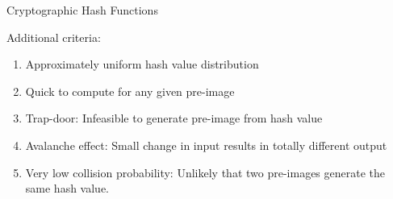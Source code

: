 \documentclass[handout]{beamer}
\begin{document}
\begin{frame}{Cryptographic Hash Functions}

Additional criteria:
	\begin{enumerate}
		\item Approximately uniform hash value distribution
		\item Quick to compute for any given pre-image
		\item Trap-door: Infeasible to generate pre-image from hash value
		\item Avalanche effect: Small change in input results in totally different output
		\item Very low collision probability: Unlikely that two pre-images generate the same hash value.
	\end{enumerate}
	\vspace{1em}

	
\end{frame}
\end{document}

